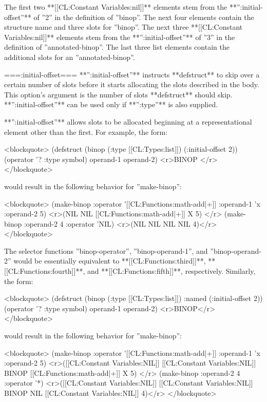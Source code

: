 The first two **[[CL:Constant Variables:nil]]** elements stem from the **'':initial-offset''** of ''2'' in the definition of ''binop''. The next four elements contain the structure name and three slots for ''binop''. The next three **[[CL:Constant Variables:nil]]** elements stem from the **'':initial-offset''** of ''3'' in the definition of ''annotated-binop''. The last three list elements contain the additional slots for an ''annotated-binop''.

===:initial-offset===
**'':initial-offset''** instructs **defstruct** to skip over a certain number of slots before it starts allocating the slots described in the body. This option's argument is the number of slots **defstruct** should skip. **'':initial-offset''** can be used only if **'':type''** is also supplied.

**'':initial-offset''** allows slots to be allocated beginning at a representational element other than the first. For example, the form:

<blockquote> 
(defstruct (binop (:type [[CL:Types:list]]) 
                  (:initial-offset 2)) 
  (operator '? :type symbol) 
  operand-1 
  operand-2) <r>BINOP </r>
</blockquote> 

would result in the following behavior for ''make-binop'':

<blockquote> 
(make-binop :operator '[[CL:Functions:math-add|+]]
            :operand-1 'x 
            :operand-2 5) <r>(NIL NIL [[CL:Functions:math-add|+]] X 5) </r>
(make-binop :operand-2 4
            :operator 'NIL) <r>(NIL NIL NIL NIL 4)</r>
</blockquote> 

The selector functions ''binop-operator'', ''binop-operand-1'', and ''binop-operand-2'' would be essentially equivalent to **[[CL:Functions:third]]**, **[[CL:Functions:fourth]]**, and **[[CL:Functions:fifth]]**, respectively. Similarly, the form:

<blockquote> 
(defstruct (binop (:type [[CL:Types:list]]) 
                  :named 
                  (:initial-offset 2)) 
  (operator '? :type symbol) 
  operand-1 
  operand-2) <r>BINOP</r>
</blockquote> 

would result in the following behavior for ''make-binop'':

<blockquote> 
(make-binop :operator '[[CL:Functions:math-add|+]] 
            :operand-1 'x 
            :operand-2 5) <r>([[CL:Constant Variables:NIL]] [[CL:Constant Variables:NIL]] BINOP [[CL:Functions:math-add|+]] X 5) </r>
(make-binop :operand-2 4 
            :operator '*) <r>([[CL:Constant Variables:NIL]] [[CL:Constant Variables:NIL]] BINOP NIL [[CL:Constant Variables:NIL]] 4)</r>
</blockquote>

